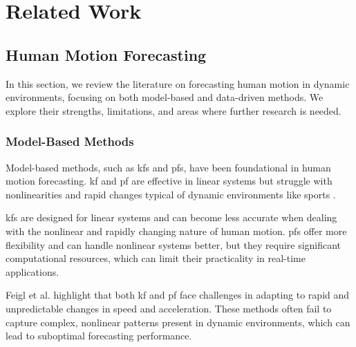 \chapter{Related Work}

\section{Human Motion Forecasting}
In this section, we review the literature on forecasting human motion in dynamic environments, focusing on both model-based and data-driven methods. We explore their strengths, limitations, and areas where further research is needed.

\subsection{Model-Based Methods}
\label{sec:model_based_methods}
Model-based methods, such as \glspl{kf} and \glspl{pf}, have been foundational in human motion forecasting. \gls{kf} and \gls{pf} are effective in linear systems but struggle with nonlinearities and rapid changes typical of dynamic environments like sports \cite{diss_tobi}.

\glspl{kf} are designed for linear systems and can become less accurate when dealing with the nonlinear and rapidly changing nature of human motion. \glspl{pf} offer more flexibility and can handle nonlinear systems better, but they require significant computational resources, which can limit their practicality in real-time applications.

Feigl et al. \cite{diss_tobi} highlight that both \gls{kf} and \gls{pf} face challenges in adapting to rapid and unpredictable changes in speed and acceleration. These methods often fail to capture complex, nonlinear patterns present in dynamic environments, which can lead to suboptimal forecasting performance.

